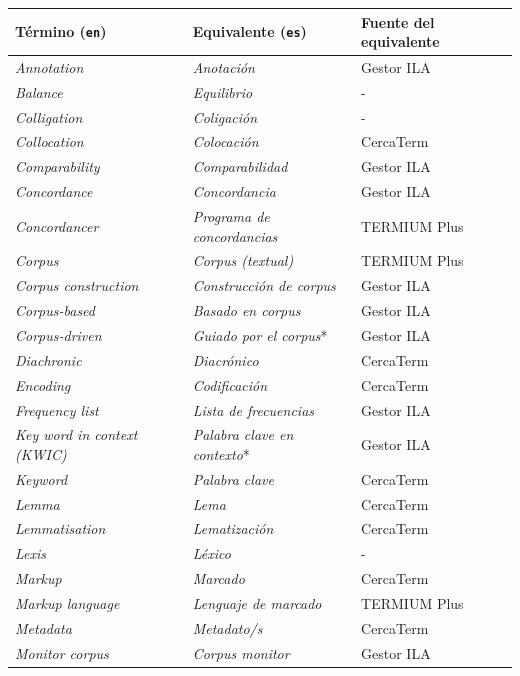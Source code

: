\begin{table}[H]
\centering
\fontsize{10}{12}\selectfont
\begin{tabular}{lll}
\toprule
\textbf{Término (\texttt{en})} & \textbf{Equivalente (\texttt{es})} & \textbf{Fuente del equivalente}\\
\midrule
\textit{Annotation} & \textit{Anotación} & Gestor ILA \\
\textit{Balance} & \textit{Equilibrio} & -\\
\textit{Colligation} & \textit{Coligación} & - \\
\textit{Collocation} & \textit{Colocación} & CercaTerm \\
\textit{Comparability} & \textit{Comparabilidad} & Gestor ILA\\
\textit{Concordance} & \textit{Concordancia} & Gestor ILA\\
\textit{Concordancer} & \textit{Programa de concordancias} & TERMIUM Plus\\
\textit{Corpus} & \textit{Corpus (textual)} & TERMIUM Plus\\
\textit{Corpus construction} & \textit{Construcción de corpus} & Gestor ILA \\
\textit{Corpus-based} & \textit{Basado en corpus} & Gestor ILA \\
\textit{Corpus-driven} & \textit{Guiado por el corpus}* & Gestor ILA \\
\textit{Diachronic} & \textit{Diacrónico} & CercaTerm  \\
\textit{Encoding} & \textit{Codificación} & CercaTerm \\
\textit{Frequency list} & \textit{Lista de frecuencias} & Gestor ILA \\
\textit{Key word in context (KWIC)} & \textit{Palabra clave en contexto}* & Gestor ILA\\
\textit{Keyword} & \textit{Palabra clave} & CercaTerm \\
\textit{Lemma} & \textit{Lema} & CercaTerm \\
\textit{Lemmatisation} & \textit{Lematización} & CercaTerm \\
\textit{Lexis} & \textit{Léxico} & - \\
\textit{Markup} & \textit{Marcado} & CercaTerm \\
\textit{Markup language} & \textit{Lenguaje de marcado} & TERMIUM Plus \\
\textit{Metadata} & \textit{Metadato/s} & CercaTerm \\
\textit{Monitor corpus} & \textit{Corpus monitor} & Gestor ILA \\

\end{tabular}
\end{table}
